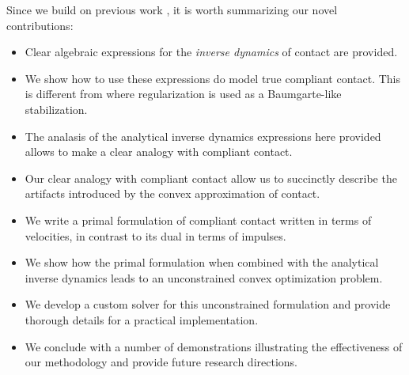 Since we build on previous work \cite{bib:anitescu2006,
bib:anitescu2010,bib:todorov2014}, it is worth summarizing our novel
contributions:
\begin{itemize}
	\item Clear algebraic expressions for the \textit{inverse dynamics} of
	contact are provided.
	\item We show how to use these expressions do model true compliant contact.
	This is different from \cite{bib:todorov2014} where regularization is used
	as a Baumgarte-like stabilization.
	\item The analasis of the analytical inverse dynamics expressions here
	provided allows to make a clear analogy with compliant contact.
	\item Our clear analogy with compliant contact allow us to succinctly
	describe the artifacts introduced by the convex approximation of contact.
	\item We write a primal formulation of compliant contact written in terms of
	velocities, in contrast to its dual in terms of impulses.
	\item We show how the primal formulation when combined with the analytical
	 inverse dynamics leads to an unconstrained convex optimization problem.
	\item We develop a custom solver for this unconstrained formulation and
	provide thorough details for a practical implementation.
	\item We conclude with a number of demonstrations illustrating the
	effectiveness of our methodology and provide future research directions.
\end{itemize}
